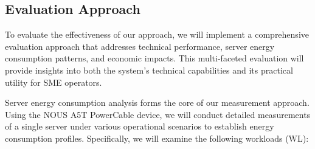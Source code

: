 \subsection{Evaluation Approach}
\label{methodology:evaluation-approach}
To evaluate the effectiveness of our approach, we will implement a comprehensive
evaluation approach that addresses technical performance, server energy
consumption patterns, and economic impacts. This multi-faceted evaluation will
provide insights into both the system's technical capabilities and its practical
utility for SME operators.

Server energy consumption analysis forms the core of our measurement approach.
Using the NOUS A5T PowerCable device, we will conduct detailed measurements of a
single server under various operational scenarios to establish energy consumption
profiles. Specifically, we will examine the following workloads (WL):

